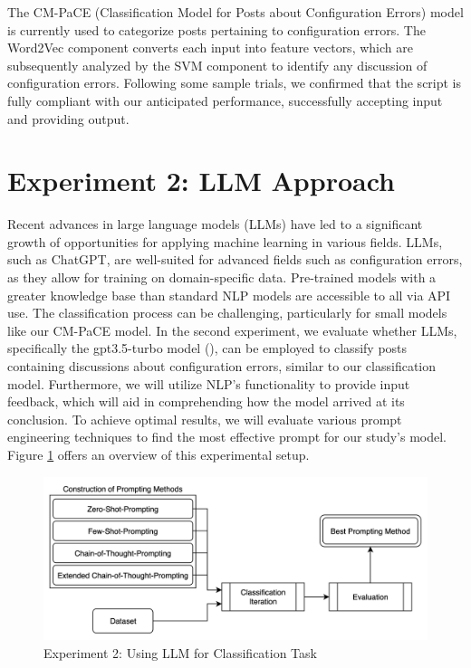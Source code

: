 \documentclass[english,bachelor]{swsLeipzig}
\begin{document}
The CM-PaCE (Classification Model for Posts about Configuration Errors) model is currently used to categorize posts 
pertaining to configuration errors. The Word2Vec component converts each input into feature vectors, which are subsequently analyzed by the SVM component to identify any discussion of configuration errors. Following some sample trials, we confirmed that the script is fully compliant with our anticipated performance, successfully accepting input and providing output.

\section{Experiment 2: LLM Approach}
Recent advances in large language models (LLMs) have led to a significant growth of opportunities for applying machine 
learning in various fields. LLMs, such as ChatGPT, are well-suited for advanced fields such as configuration errors, as they allow for training on domain-specific data. Pre-trained models with a greater knowledge base than standard NLP models are accessible to all via API use. The classification process can be challenging, particularly for small models like our CM-PaCE model. In the second experiment, we evaluate whether LLMs, specifically the gpt3.5-turbo model (\citeauthor{openai:2023}), can be employed to classify posts containing discussions about configuration errors, similar to our classification model. Furthermore, we will utilize NLP's functionality to provide input feedback, which will aid in comprehending how the model arrived at its conclusion. To achieve optimal results, we will evaluate various prompt engineering techniques to find the most effective prompt for our study's model. Figure \ref{fig:figure43} offers an overview of this experimental setup.


\begin{figure}[h]
  \includegraphics[width=1\textwidth]{images/figure3.png}
  \caption{Experiment 2: Using LLM for Classification Task}
  \label{fig:figure43}
\end{figure}
\end{document}
